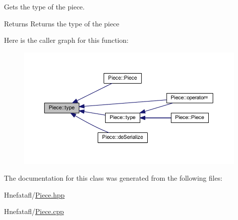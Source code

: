 Gets the type of the piece. 

\begin{DoxyReturn}{Returns}
Returns the type of the piece 
\end{DoxyReturn}


Here is the caller graph for this function\-:\nopagebreak
\begin{figure}[H]
\begin{center}
\leavevmode
\includegraphics[width=350pt]{class_piece_a64d970cf7c3d34014d8a36cc3bd3c908_icgraph}
\end{center}
\end{figure}




The documentation for this class was generated from the following files\-:\begin{DoxyCompactItemize}
\item 
Hnefatafl/\hyperlink{_piece_8hpp}{Piece.\-hpp}\item 
Hnefatafl/\hyperlink{_piece_8cpp}{Piece.\-cpp}\end{DoxyCompactItemize}

